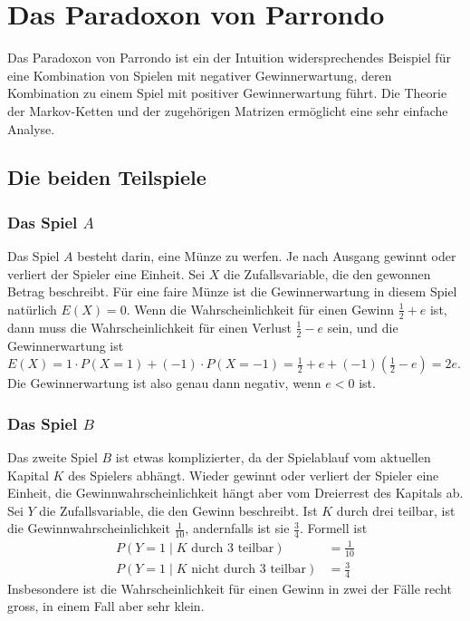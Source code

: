 %
%
%
\section{Das Paradoxon von Parrondo
\label{buch:section:paradoxon-von-parrondo}}
Das Paradoxon von Parrondo ist ein der Intuition widersprechendes
Beispiel für eine Kombination von Spielen mit negativer Gewinnerwartung,
deren Kombination zu einem Spiel mit positiver Gewinnerwartung führt.
Die Theorie der Markov-Ketten und der zugehörigen Matrizen ermöglicht
eine sehr einfache Analyse.

%
%
\subsection{Die beiden Teilspiele
\label{buch:subsection:teilspiele}}


\subsubsection{Das Spiel $A$}
Das Spiel $A$ besteht darin, eine Münze zu werfen.
Je nach Ausgang gewinnt oder verliert der Spieler eine Einheit.
Sei $X$ die Zufallsvariable, die den gewonnen Betrag beschreibt.
Für eine faire Münze ist die Gewinnerwartung in diesem Spiel natürlich
$E(X)=0$.
Wenn die Wahrscheinlichkeit für einen Gewinn $\frac12+e$ ist, dann muss
die Wahrscheinlichkeit für einen Verlust $\frac12-e$ sein, und die 
Gewinnerwartung ist
\(
E(X)
=
1\cdot P(X=1) + (-1)\cdot P(X=-1)
=
\frac12+e + (-1)(\frac12-e)
=
2e.
\)
Die Gewinnerwartung ist also genau dann negativ, wenn $e<0$ ist.

\subsubsection{Das Spiel $B$}
Das zweite Spiel $B$ ist etwas komplizierter, da der Spielablauf vom 
aktuellen Kapital $K$ des Spielers abhängt.
%
Wieder gewinnt oder verliert der Spieler eine Einheit,
die Gewinnwahrscheinlichkeit hängt aber vom Dreierrest des Kapitals ab.
Sei $Y$ die Zufallsvariable, die den Gewinn beschreibt.
Ist $K$ durch drei teilbar, ist die Gewinnwahrscheinlichkeit $\frac1{10}$,
andernfalls ist sie $\frac34$.
Formell ist
\begin{equation}
\begin{aligned}
P(Y=1\mid \text{$K$ durch $3$ teilbar}) &=  \frac{1}{10}
\\
P(Y=1\mid \text{$K$ nicht durch $3$ teilbar}) &= \frac{3}{4}
\end{aligned}
\label{buch:wahrscheinlichkeit:eqn:Bwahrscheinlichkeiten}
\end{equation}
Insbesondere ist die Wahrscheinlichkeit für einen Gewinn in zwei der
Fälle recht gross, in einem Fall aber sehr klein.


